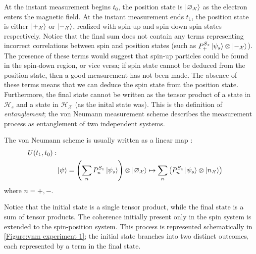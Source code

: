 At the instant measurement begins $t_0$, the position state is $\ket{\varnothing_\mathcal{X}}$ as the electron enters the magnetic field. At the instant measurement ends $t_1$, the position state is either $\ket{+_{\mathcal{X}}}$ or $\ket{-_{\mathcal{X}}}$, realized with spin-up and spin-down spin states respectively. Notice that the final sum does not contain any terms representing incorrect correlations between spin and position states (such as $ P^{S_z}_+ \ket{\psi_s} \otimes \ket{-_{\mathcal{X}}}$). The presence of these terms would suggest that spin-up particles could be found in the spin-down region, or vice versa; if spin state cannot be deduced from the position state, then a good measurement has not been made. The absence of these terms means that we can deduce the spin state from the position state. Furthermore, the final state cannot be written as the tensor product of a state in $\mathcal{H}_s$ and a state in $\mathcal{H}_\mathcal{X}$ (as the inital state was). This is the definition of \textit{entanglement}; the von Neumann measurement scheme describes the measurement process as entanglement of two independent systems.

The von Neumann scheme is usually written as a linear map \cite{Schlosshauer}:
\begin{align} \label{eq: general final state}
    \nonumber U(t_1, t_0): \\
    & \ket{\psi} = \left(\sum_{n} P^{S_z}_n\ket{\psi_s}\right) \otimes \ket{\varnothing_\mathcal{X}} \mapsto \sum_{n}\left(P^{S_z}_n\ket{\psi_s} \otimes \ket{n_\mathcal{X}}\right)
\end{align}
where $n = +, -$.

Notice that the initial state is a single tensor product, while the final state is a sum of tensor products. The coherence initially present only in the spin system is extended to the spin-position system. This process is represented schematically in \autoref{Figure:vnm experiment 1}; the initial state branches into two distinct outcomes, each represented by a term in the final state.

